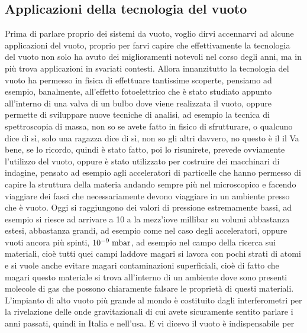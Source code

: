 \subsection{Applicazioni della tecnologia del vuoto}

Prima di parlare proprio dei sistemi da vuoto, voglio dirvi accennarvi ad alcune applicazioni del vuoto, proprio per farvi capire che effettivamente la tecnologia del vuoto non solo ha avuto dei miglioramenti notevoli nel corso degli anni, ma in più trova applicazioni in svariati contesti. Allora innanzitutto la tecnologia del vuoto ha permesso in fisica di effettuare tantissime scoperte, pensiamo ad esempio, banalmente, all'effetto fotoelettrico che è stato studiato appunto all'interno di una valva di un bulbo dove viene realizzata il vuoto, oppure permette di sviluppare nuove tecniche di analisi, ad esempio la tecnica di spettroscopia di massa, non so se avete fatto in fisico di sfrutturare, o qualcuno dice di sì, solo una ragazza dice di sì, non so gli altri davvero, no questo è il il Va bene, se lo ricordo, quindi è stato fatto, poi lo risunirete, prevede ovviamente l'utilizzo del vuoto, oppure è stato utilizzato per costruire dei macchinari di indagine, pensato ad esempio agli acceleratori di particelle che hanno permesso di capire la struttura della materia andando sempre più nel microscopico e facendo viaggiare dei fasci che necessariamente devono viaggiare in un ambiente presso che è vuoto. Oggi si raggiungono dei valori di pressione estremamente bassi, ad esempio si riesce ad arrivare a 10 a la mezz'iove millibar su volumi abbastanza estesi, abbastanza grandi, ad esempio come nel caso degli acceleratori, oppure vuoti ancora più spinti, $10^{-9} \rm \; mbar$, ad esempio nel campo della ricerca sui materiali, cioè tutti quei campi laddove magari si lavora con pochi strati di atomi e si vuole anche evitare magari contaminazioni superficiali, cioè di fatto che magari questo materiale si trova all'interno di un ambiente dove sono presenti molecole di gas che possono chiaramente falsare le proprietà di questi materiali. L'impianto di alto vuoto più grande al mondo è costituito dagli interferometri per la rivelazione delle onde gravitazionali di cui avete sicuramente sentito parlare i anni passati, quindi in Italia e nell'usa. E vi dicevo il vuoto è indispensabile per 


